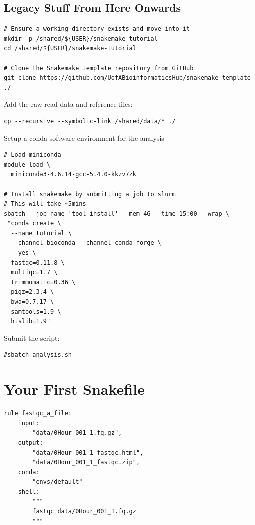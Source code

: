 \subsection{Legacy Stuff From Here Onwards}

\begin{lstlisting}
# Ensure a working directory exists and move into it
mkdir -p /shared/${USER}/snakemake-tutorial
cd /shared/${USER}/snakemake-tutorial

# Clone the Snakemake template repository from GitHub
git clone https://github.com/UofABioinformaticsHub/snakemake_template ./
\end{lstlisting}

Add the raw read data and reference files:

\begin{lstlisting}
cp --recursive --symbolic-link /shared/data/* ./
\end{lstlisting}

Setup a conda software environment for the analysis

\begin{lstlisting}
# Load miniconda
module load \
  miniconda3-4.6.14-gcc-5.4.0-kkzv7zk

# Install snakemake by submitting a job to slurm
# This will take ~5mins
sbatch --job-name 'tool-install' --mem 4G --time 15:00 --wrap \
 "conda create \
  --name tutorial \
  --channel bioconda --channel conda-forge \
  --yes \
  fastqc=0.11.8 \
  multiqc=1.7 \
  trimmomatic=0.36 \
  pigz=2.3.4 \
  bwa=0.7.17 \
  samtools=1.9 \
  htslib=1.9"
\end{lstlisting}



Submit the script:

\begin{lstlisting}
#sbatch analysis.sh
\end{lstlisting}














\section{Your First Snakefile}


\begin{lstlisting}
rule fastqc_a_file:
	input:
		"data/0Hour_001_1.fq.gz",
	output:
		"data/0Hour_001_1_fastqc.html",
		"data/0Hour_001_1_fastqc.zip",
	conda:
		"envs/default"
	shell:
		"""
		fastqc data/0Hour_001_1.fq.gz
		"""
\end{lstlisting}


